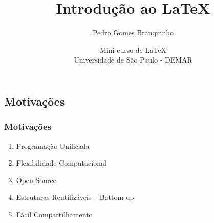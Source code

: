 \documentclass{beamer}
\title[Introdução]{\Huge{Introdução ao \LaTeX}}
\author[Branquinho]{Pedro Gomes Branquinho \\
    \text{\scriptsize{pedro.branquinho@usp.br}}}
\date[Lógica/Estrutura]{\scriptsize{Mini-curso de \LaTeX} \\ Universidade de São Paulo - DEMAR}
\begin{document}
{
\begin{frame}
  \titlepage
\end{frame}
}

\begin{frame}
  \section{Motivações}
  \frametitle{Motivações}

  \begin{enumerate}
  \item<1->{Programação Unificada}
  \item<5->{Flexibilidade Computacional}
  \item<2->{Open Source}
  \item<3->{Estruturas Reutilizáveis -- Bottom-up}
  \item<4->{Fácil Compartilhamento}
  \end{enumerate}


\end{frame}
\end{document}
